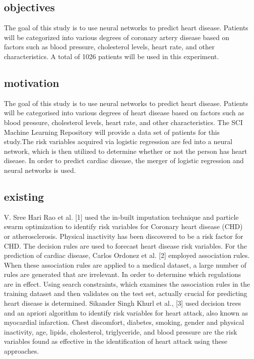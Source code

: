 \documentclass[12pt]{article}
\begin{document}
\subsection{objectives}
The goal of this study is to use neural networks to predict heart disease. Patients will be categorized into various degrees of coronary artery disease based on factors such as blood pressure, cholesterol levels, heart rate, and other characteristics. A total of 1026 patients will be used in this experiment.
\subsection{motivation}
The goal of this study is to use neural networks to predict heart disease. Patients will be categorised into various degrees of heart disease based on factors such as blood pressure, cholesterol levels, heart rate, and other characteristics. The SCI Machine Learning Repository will provide a data set of  patients for this study.The risk variables acquired via logistic regression are fed into a neural network, which is then utilized to determine whether or not the person has heart disease. In order to predict cardiac disease, the merger of logistic regression and neural networks is used.

\subsection{existing}
V. Sree Hari Rao et al. [1] used the in-built imputation technique and particle swarm optimization to identify risk variables for Coronary heart disease (CHD) or atherosclerosis. Physical inactivity has been discovered to be a risk factor for CHD. The decision rules are used to forecast heart disease risk variables.
For the prediction of cardiac disease, Carlos Ordonez et al. [2] employed association rules. When these association rules are applied to a medical dataset, a large number of rules are generated that are irrelevant. In order to determine which regulations are in effect.
Using search constraints, which examines the association rules in the training dataset and then validates on the test set, actually crucial for predicting heart disease is determined.
Sikander Singh Khurl et al., [3] used decision trees and an apriori algorithm to identify risk variables for heart attack, also known as myocardial infarction. Chest discomfort, diabetes, smoking, gender and physical inactivity, age, lipids, cholesterol, triglyceride, and blood pressure are the risk variables found as effective in the identification of heart attack using these approaches.
\end{document}
